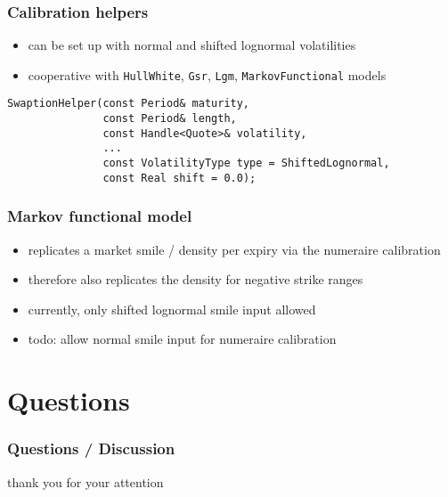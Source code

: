 \documentclass{beamer}
\begin{document}
\begin{frame}[fragile]
\frametitle{Calibration helpers}
\begin{itemize}
\item can be set up with normal and shifted lognormal volatilities
\item cooperative with \verb+HullWhite+, \verb+Gsr+, \verb+Lgm+, \verb+MarkovFunctional+ models
\end{itemize}
\begin{verbatim}
SwaptionHelper(const Period& maturity,
               const Period& length,
               const Handle<Quote>& volatility,
               ...
               const VolatilityType type = ShiftedLognormal,
               const Real shift = 0.0);
\end{verbatim}
\end{frame}

\begin{frame}[fragile]
\frametitle{Markov functional model}
\begin{itemize}
\item replicates a market smile / density per expiry via the numeraire calibration
\item therefore also replicates the density for negative strike ranges
\item currently, only shifted lognormal smile input allowed
\item todo: allow normal smile input for numeraire calibration
\end{itemize}
\end{frame}

\section{Questions}

\begin{frame}[fragile]
\frametitle{Questions / Discussion}
\centerline{thank you for your attention}
\end{frame}
\end{document}
